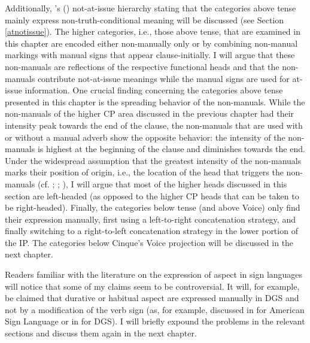 Additionally, \citeauthor{bross2017scope}'s (\citeyear{bross2017scope}) not-at-issue hierarchy stating that the categories above tense mainly express non-truth-conditional meaning will be discussed (see Section \ref{atnotissue}). The higher categories, i.e., those above tense, that are examined in this chapter are encoded either non-manually only or by combining non-manual markings with manual signs that appear clause-initially. I will argue that these non-manuals are reflections of the respective functional heads and that the non-manuals contribute not-at-issue meanings while the manual signs are used for at-issue information. One crucial finding concerning the categories above tense presented in this chapter is the spreading behavior of the non-manuals. While the non-manuals of the higher CP area discussed in the previous chapter had their intensity peak towards the end of the clause, the non-manuals that are used with or without a manual adverb show the opposite behavior: the intensity of the non-manuals is highest at the beginning of the clause and diminishes towards the end. Under the widespread assumption that the greatest intensity of the non-manuals marks their position of origin, i.e., the location of the head that triggers the non-manuals (cf. \citealt{bahan1996, petronio1997}; \citealt[43--45]{neidle2000syntax}; \citealt[311--312]{sandler2006sign}), I will argue that most of the higher heads discussed in this section are left-headed (as opposed to the higher CP heads that can be taken to be right-headed). Finally, the categories below tense (and above Voice) only find their expression manually, first using a left-to-right concatenation strategy, and finally switching to a right-to-left concatenation strategy in the lower portion of the IP. The categories below Cinque's Voice projection will be discussed in the next chapter. %

Readers familiar with the literature on the expression of aspect in sign languages will notice that some of my claims seem to be controversial. It will, for example, be claimed that durative or habitual aspect are expressed manually in DGS and not by a modification of the verb sign (as, for example, discussed in \citealt{rathmann2005event} for American Sign Language or in \citealt{happ2014vork}  for DGS). I will briefly expound the problems in the relevant sections and discuss them again in the next chapter. 

